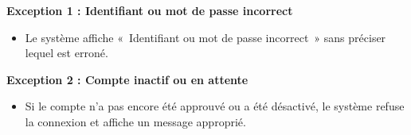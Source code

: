 \documentclass[11pt]{article}
\begin{document}
\begin{description}[leftmargin=4.2cm, style=nextline]
    \item[Exceptions]
    \textbf{Exception 1 : Identifiant ou mot de passe incorrect}
    \begin{itemize}[leftmargin=*, nosep]
        \item Le système affiche «~Identifiant ou mot de passe incorrect~»
              sans préciser lequel est erroné.
    \end{itemize}
    \textbf{Exception 2 : Compte inactif ou en attente}
    \begin{itemize}[leftmargin=*, nosep]
        \item Si le compte n'a pas encore été approuvé ou a été désactivé,
              le système refuse la connexion et affiche un message approprié.
    \end{itemize}
\end{description}
\end{document}
